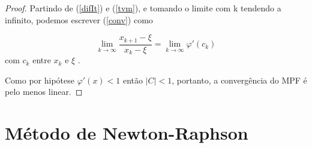 \begin{proof}
Partindo de (\ref{difIt}) e (\ref{tvm}), e tomando o  limite com k tendendo a infinito, podemos escrever (\ref{conv}) como

\begin{equation*} %
    \lim_{k \to \infty} \frac{x_{k+1} - \xi}{x_k - \xi} = \lim_{k \to \infty}\varphi'(c_k)
\end{equation*} %
com $c_k$ entre $x_k$ e $\xi$
. %

Como por hipótese $\varphi'(x) < 1$ então $|C| < 1$, portanto, a convergência do MPF é pelo menos linear.
\end{proof}
\newpage
    
\section{Método de Newton-Raphson}


